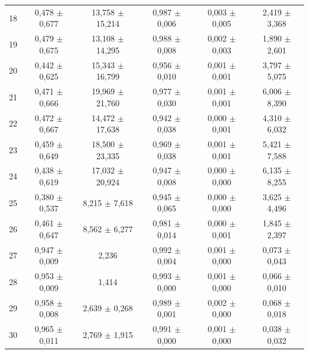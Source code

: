 \begin{tabular}{l c c c c c}
18 & 0,478 $\pm$ 0,677 & 13,758 $\pm$ 15,214 & 0,987 $\pm$ 0,006 & 0,003 $\pm$ 0,005 & 2,419 $\pm$ 3,368 \\
19 & 0,479 $\pm$ 0,675 & 13,108 $\pm$ 14,295 & 0,988 $\pm$ 0,008 & 0,002 $\pm$ 0,003 & 1,890 $\pm$ 2,601 \\
20 & 0,442 $\pm$ 0,625 & 15,343 $\pm$ 16,799 & 0,956 $\pm$ 0,010 & 0,001 $\pm$ 0,001 & 3,797 $\pm$ 5,075 \\
21 & 0,471 $\pm$ 0,666 & 19,969 $\pm$ 21,760 & 0,977 $\pm$ 0,030 & 0,001 $\pm$ 0,001 & 6,006 $\pm$ 8,390 \\
22 & 0,472 $\pm$ 0,667 & 14,472 $\pm$ 17,638 & 0,942 $\pm$ 0,038 & 0,000 $\pm$ 0,001 & 4,310 $\pm$ 6,032 \\
23 & 0,459 $\pm$ 0,649 & 18,500 $\pm$ 23,335 & 0,969 $\pm$ 0,038 & 0,001 $\pm$ 0,001 & 5,421 $\pm$ 7,588 \\
24 & 0,438 $\pm$ 0,619 & 17,032 $\pm$ 20,924 & 0,947 $\pm$ 0,008 & 0,000 $\pm$ 0,000 & 6,135 $\pm$ 8,255 \\
25 & 0,380 $\pm$ 0,537 & 8,215 $\pm$ 7,618 & 0,945 $\pm$ 0,065 & 0,000 $\pm$ 0,000 & 3,625 $\pm$ 4,496 \\
26 & 0,461 $\pm$ 0,647 & 8,562 $\pm$ 6,277 & 0,981 $\pm$ 0,014 & 0,000 $\pm$ 0,001 & 1,845 $\pm$ 2,397 \\
27 & 0,947 $\pm$ 0,009 & 2,236 & 0,992 $\pm$ 0,004 & 0,001 $\pm$ 0,000 & 0,073 $\pm$ 0,043 \\
28 & 0,953 $\pm$ 0,009 & 1,414 & 0,993 $\pm$ 0,000 & 0,001 $\pm$ 0,000 & 0,066 $\pm$ 0,010 \\
29 & 0,958 $\pm$ 0,008 & 2,639 $\pm$ 0,268 & 0,989 $\pm$ 0,001 & 0,002 $\pm$ 0,000 & 0,068 $\pm$ 0,018 \\
30 & 0,965 $\pm$ 0,011 & 2,769 $\pm$ 1,915 & 0,991 $\pm$ 0,000 & 0,001 $\pm$ 0,000 & 0,038 $\pm$ 0,032 \\
\hline 
 \end{tabular}

